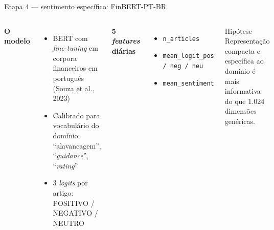 \documentclass[10pt,aspectratio=169]{beamer}
\begin{document}
\begin{frame}{Etapa 4 --- sentimento específico: FinBERT-PT-BR}
  \begin{columns}[T]
    \textbf{O modelo}
    \begin{itemize}
      \item BERT com \textit{fine-tuning} em corpora financeiros em português (Souza et al., 2023)
      \item Calibrado para vocabulário do domínio: ``alavancagem'', ``\textit{guidance}'', ``\textit{rating}''
      \item 3 \textit{logits} por artigo: POSITIVO / NEGATIVO / NEUTRO
    \end{itemize}
    \textbf{5 \textit{features} diárias}
    \begin{itemize}
      \item \texttt{n\_articles}
      \item \texttt{mean\_logit\_pos / neg / neu}
      \item \texttt{mean\_sentiment}
    \end{itemize}
    \vspace{1ex}
    \begin{block}{Hipótese}
      Representação compacta e específica ao domínio é mais
      informativa do que 1.024 dimensões genéricas.
    \end{block}
  \end{columns}
\end{frame}
\end{document}
